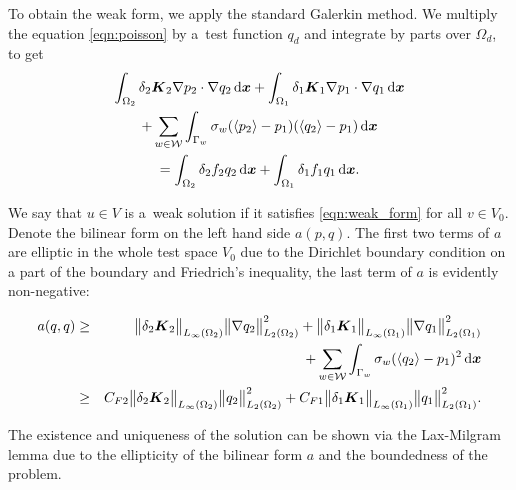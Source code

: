 To obtain the weak form, we apply the standard Galerkin method. We multiply the equation \eqref{eqn:poisson} 
by a~test function $q_d$ and integrate by parts over $\Omega_d$, to get
\begin{multline} \label{eqn:weak_form1}
  \int_{\Omega_2} \delta_2 \mathbf{\boldsymbol{K}}_2 \nabla p_2 \cdot \nabla q_2 \,{\rm d}\mathbf{\boldsymbol{x}}
  + \int_{\Omega_1} \delta_1 \mathbf{\boldsymbol{K}}_1 \nabla p_1 \cdot \nabla q_1 \,{\rm d}\mathbf{\boldsymbol{x}} \\
  + \sum_{w\in \mathcal{W}} \int_{\Gamma_w} \sigma_w (\langle p_2\rangle - p_1) (\langle q_2\rangle - p_1) \,{\rm d}\mathbf{\boldsymbol{x}} \\
  = \int_{\Omega_2} \delta_2 f_2 q_2 \,{\rm d}\mathbf{\boldsymbol{x}} + \int_{\Omega_1} \delta_1 f_1 q_1 \,{\rm d}\mathbf{\boldsymbol{x}}.
\end{multline}

We say that $u\in V$ is a~weak solution if it satisfies \eqref{eqn:weak_form} for all $v\in V_0$.
Denote the bilinear form on the left hand side $a(p,q)$.
The first two terms of $a$ are elliptic in the whole test space $V_0$
due to the Dirichlet boundary condition on a part of the boundary and Friedrich's inequality,
the last term of $a$ is evidently non-negative:

\begin{eqnarray}
    a(q,q) &\geq&
          \bigl\Vert\delta_2 \mathbf{\boldsymbol{K}}_2\bigr\Vert_{L_\infty(\Omega_2)}\bigl\Vert\nabla q_2\bigr\Vert^2_{L_2(\Omega_2)}
        + \bigl\Vert\delta_1 \mathbf{\boldsymbol{K}}_1\bigr\Vert_{L_\infty(\Omega_1)}\bigl\Vert\nabla q_1\bigr\Vert^2_{L_2(\Omega_1)}\\
        &&+ \sum_{w\in \mathcal{W}} \int_{\Gamma_w} \sigma_w (\langle q_2\rangle - p_1)^2 \,{\rm d}\mathbf{\boldsymbol{x}} \\
        &\geq&
          C_{F2} \bigl\Vert\delta_2 \mathbf{\boldsymbol{K}}_2\bigr\Vert_{L_\infty(\Omega_2)}\bigl\Vert q_2\bigr\Vert^2_{L_2(\Omega_2)}
        + C_{F1} \bigl\Vert\delta_1 \mathbf{\boldsymbol{K}}_1\bigr\Vert_{L_\infty(\Omega_1)}\bigl\Vert q_1\bigr\Vert^2_{L_2(\Omega_1)}.
\end{eqnarray}

The existence and uniqueness of the solution can be shown 
via the Lax-Milgram lemma due to the ellipticity of the bilinear form $a$ and the boundedness of the problem.









